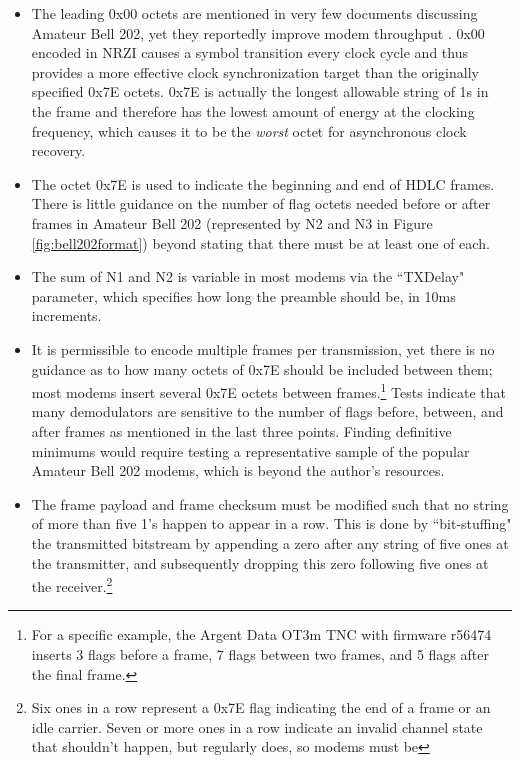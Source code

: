 \begin{itemize}
	\item The leading 0x00 octets are mentioned in very few documents
		discussing Amateur Bell 202, yet they reportedly improve modem
		throughput \cite{millerinterview}\cite{aprsunveiled}. 
		0x00 encoded in NRZI causes a symbol transition
		every clock cycle and thus provides a more effective clock 
		synchronization target than the originally specified 0x7E octets. 
		0x7E is actually 
		the longest allowable string of 1s in the frame and 
		therefore has the lowest amount of energy at the clocking frequency,
		which causes it to be the \emph{worst} 
		octet for asynchronous clock recovery.
	\item The octet 0x7E is used to indicate the beginning and end of 
		HDLC frames.
		There is little guidance on the number of flag octets needed before
		or after frames in Amateur Bell 202 (represented by N2 and N3 in 
		Figure \ref{fig:bell202format})
		beyond stating that there must be at least one of each. 
	\item The sum of
		N1 and N2 is variable in most modems via the ``TXDelay" parameter,
		which specifies how long the preamble should be, in 10ms increments.
	\item It is permissible to encode multiple 
		frames per transmission, yet there is no guidance as to how
		many octets of 0x7E should be included between them;
		most modems insert several 0x7E octets between 
		frames.\footnote{For a specific example, the Argent Data OT3m TNC 
			with firmware r56474 inserts 3 flags before
		a frame, 7 flags between two frames, and 5 flags after the final frame.}
		Tests indicate that many demodulators are sensitive to the number of flags 
		before, between, and after frames as mentioned in the last three points.
		Finding definitive minimums would require testing a representative
		sample of the
		popular Amateur Bell 202 modems, which is beyond the author's resources.
	\item The frame payload and frame checksum must be modified such 
		that no string of more than five 1's happen to appear in a row.
		This is done by ``bit-stuffing" the transmitted bitstream by
		appending a zero after any string of five ones at the transmitter,
		and subsequently dropping this zero following five ones at the 
		receiver.\footnote{Six ones in a row represent a 0x7E flag indicating 
			the end of a frame or an idle carrier.
			Seven or more ones in a row indicate an invalid channel state
			that shouldn't happen, but regularly does, so modems must be 
}
\end{itemize}
